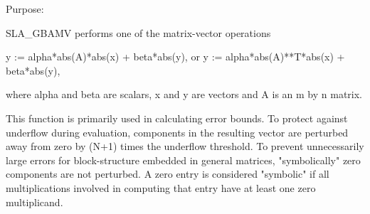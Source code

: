  \begin{DoxyParagraph}{Purpose\+: }
\begin{DoxyVerb} SLA_GBAMV  performs one of the matrix-vector operations

         y := alpha*abs(A)*abs(x) + beta*abs(y),
    or   y := alpha*abs(A)**T*abs(x) + beta*abs(y),

 where alpha and beta are scalars, x and y are vectors and A is an
 m by n matrix.

 This function is primarily used in calculating error bounds.
 To protect against underflow during evaluation, components in
 the resulting vector are perturbed away from zero by (N+1)
 times the underflow threshold.  To prevent unnecessarily large
 errors for block-structure embedded in general matrices,
 "symbolically" zero components are not perturbed.  A zero
 entry is considered "symbolic" if all multiplications involved
 in computing that entry have at least one zero multiplicand.\end{DoxyVerb}
 
\end{DoxyParagraph}

